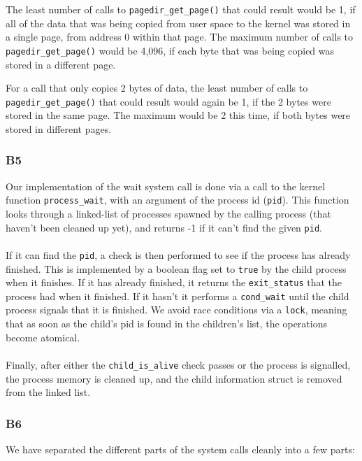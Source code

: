 \documentclass[a4wide, 11pt]{article}
\newcommand{\tx}{\texttt}
\begin{document}
The least number of calls to \tx{pagedir\_get\_page()} that could result would be 1, if all of the data that was being copied from user space to the kernel was stored in a single page, from address 0 within that page. The maximum number of calls to \tx{pagedir\_get\_page()} would be 4,096, if each byte that was being copied was stored in a different page.

For a call that only copies 2 bytes of data, the least number of calls to \tx{pagedir\_get\_page()} that could result would again be 1, if the 2 bytes were stored in the same page. The maximum would be 2 this time, if both bytes were stored in different pages.

\subsubsection{B5}

Our implementation of the wait system call is done via a call to the kernel function \texttt{process\_wait}, with an argument of the process id (\texttt{pid}). This function looks through a linked-list of processes spawned by the calling process (that haven't been cleaned up yet), and returns -1 if it can't find the given \texttt{pid}.
\\\\
If it can find the \texttt{pid}, a check is then performed to see if the process has already finished. This is implemented by a boolean flag set to \texttt{true} by the child process when it finishes. If it has already finished, it returns the \texttt{exit\_status} that the process had when it finished. If it hasn't it performs a \texttt{cond\_wait} until the child process signals that it is finished. We avoid race conditions via a \texttt{lock}, meaning that as soon as the child's pid is found in the children's list, the operations become atomical.
\\\\
Finally, after either the \texttt{child\_is\_alive} check passes or the process is signalled, the process memory is cleaned up, and the child information struct is removed from the linked list.

\subsubsection{B6}

We have separated the different parts of the system calls cleanly into a few parts:
\end{document}
